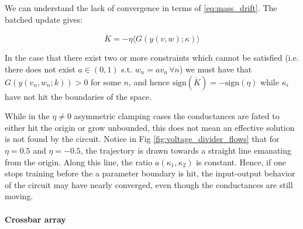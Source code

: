 \documentclass[final, 11pt, nonatbib]{elsarticle}
\theoremstyle{definition}
\theoremstyle{plain}
\newcommand{\AGK}{\color{blue}}
\numberwithin{equation}{section}
\begin{document}
We can understand the lack of convergence in terms of \eqref{eq:mass_drift}. The batched update gives:

\[
\dot{K} = -\eta \langle G(y(v, w);\kappa) \rangle
\]

In the case that there exist two or more constraints which cannot be satisfied (i.e. there does not exist $a \in (0,1)$ s.t. $w_n = a v_n\,\forall n$) we must have that $G(y(v_n, w_n;k)) >0$ for some $n$, and hence $\text{sign} (\dot{K}) = -\text{sign}(\eta)$ while $\kappa_i$ have not hit the boundaries of the space.

While in the $\eta\neq 0$ asymmetric clamping cases the conductances are fated to either hit the origin or grow unbounded, this does not mean an effective solution is not found by the circuit. Notice in Fig \ref{fig:voltage_divider_flows} that for $\eta=0.5$ and $\eta=-0.5$, the trajectory is drawn towards a straight line emanating from the origin. Along this line, the ratio $a(\kappa_1, \kappa_2)$ is constant. Hence, if one stops training before the a parameter boundary is hit, the input-output behavior of the circuit may have nearly converged, even though the conductances are still moving.




\paragraph{Crossbar array}

\end{document}

